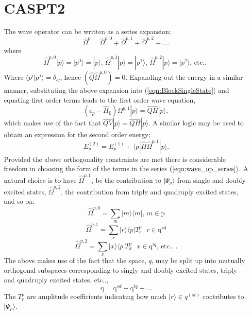 \documentclass[12pt]{article}
\begin{document}
\section{ CASPT2 }
\noindent The wave operator can be written as a series expansion;
\begin{equation}
\hat{\Omega}^{p} = \hat{\Omega}^{p,0}+\hat{\Omega}^{p,1}+\hat{\Omega}^{p,2}+....
\end{equation} 
where 
\begin{equation}
\hat{\Omega}^{p,0}|p\rangle = |p^{0}\rangle = |p\rangle \text{, \ \  }
\hat{\Omega}^{p,1}|p\rangle = |p^{1}\rangle \text{, \ \ }
\hat{\Omega}^{p,2}|p\rangle = |p^{2}\rangle \text{, \  etc.. }
\label{eqn:wave_op_series}
\end{equation} 
Where  $\langle p^{i} | p^{j} \rangle=  \delta_{ij}$,  hence $(\hat{Q}\hat{\Omega}^{p,0}) = 0$.
Expanding out the energy in a similar manner,
substituting the above expansion into (\ref{eqn:BlockSingleState}) and equating first order terms leads to the first order
wave equation,
\begin{equation}
(\epsilon_{p} - \hat{H}_{0} )\Omega^{p,1}|p\rangle = \hat{Q}\hat{H}|p\rangle ,
\label{eqn:Bloch_singlestate_firstorder}
\end{equation}
which makes use of the fact that $ \hat{Q}\hat{V}|p\rangle= \hat{Q}\hat{H}|p\rangle$. A similar logic may be
used to obtain an expression for the second order energy;
\begin{equation}
E_{p}^{(2)} = E_{p}^{(1)} + \langle p | \hat{H} \hat{\Omega}^{p,1}| p \rangle .
\label{eqn:single_state_ptE_second_order}
\end{equation}
Provided the above orthogonality constraints are met there is considerable freedom in choosing the form of the terms in the
series $(\ref{eqn:wave_op_series})$.  A natural choice is to have $\hat{\Omega}^{p,1}$, be the contribution
to $|\Psi_{p}\rangle$ from single and doubly excited states, $\hat{\Omega}^{p,2}$,  the contribution from triply
and quadruply excited states, and so on:
\begin{equation*}
\hat{\Omega}^{p,0} = \sum_{m} |m \rangle \langle m |   \text{, \ \ \  } m \in \mathrm{p}
\end{equation*}
\begin{equation*}
\hat{\Omega}^{p,1} = \sum_{r}| r \rangle \langle p | T^{p}_{r} \text{ \ \ \ } r \in \mathrm{q}^{sd} 
\end{equation*}
\begin{equation*}
\hat{\Omega}^{p,2} = \sum_{x}| x \rangle \langle p | T^{p}_{x} \text{ \ \ \ } x \in \mathrm{q}^{tq}  \text{, \  etc.. }.
\end{equation*}
The above makes use of the fact that the space, $q$, may be split up into mutually orthogonal 
subspaces corresponding to singly and doubly excited states, triply and quadruply excited states, etc..,
\begin{equation}
\mathrm{q} = \mathrm{q}^{sd} + \mathrm{q}^{tq} + ...
\end{equation}
The $T^{p}_{r}$ are amplitude coefficients indicating how much $|r\rangle \in q^{(st)}$
contributes to $|\Psi_{p}\rangle$.\\
\end{document}
